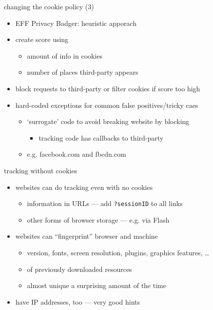 \begin{frame}{changing the cookie policy (3)}
    \begin{itemize}
    \item EFF Privacy Badger: heuristic apporach
    \item create score using 
        \begin{itemize}
        \item amount of info in cookies
        \item number of places third-party appears
        \end{itemize}
    \item block requests to third-party or filter cookies if score too high
    \item hard-coded exceptions for common false positives/tricky caes
        \begin{itemize}
        \item `surrogate' code to avoid breaking website by blocking
            \begin{itemize}
            \item tracking code has callbacks to third-party
            \end{itemize}
        \item e.g. facebook.com and fbcdn.com
        \end{itemize}
    \end{itemize}
\end{frame}

\begin{frame}[fragile,label=noCookieTrack]{tracking without cookies}
    \begin{itemize}
    \item websites can do tracking even with no cookies
        \begin{itemize}
        \item information in URLs --- add \texttt{?sessionID} to all links
        \item other forms of browser storage --- e.g. via Flash
        \end{itemize}
    \item websites can ``fingerprint'' browser and machine
        \begin{itemize}
        \item version, fonts, screen resolution, plugins, graphics features, \ldots
        \item {} of previously downloaded resources
        \item almost unique a surprising amount of the time
        \end{itemize}
    \item have IP addresses, too --- very good hints
    \end{itemize}
\end{frame}

